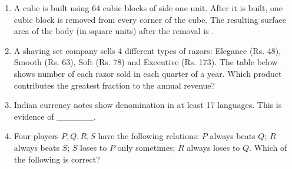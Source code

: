 \documentclass[journal]{IEEEtran}
\begin{document}
\begin{enumerate}
\item A cube is built using 64 cubic blocks of side one unit. After it is built, one cubic block is removed from every corner of the cube. The resulting surface area of the body (in square units) after the removal is . \hfill {}
\begin{enumerate}
\end{enumerate}

\item A shaving set company sells 4 different types of razors: Elegance (Rs. 48), Smooth (Rs. 63), Soft (Rs. 78) and Executive (Rs. 173). The table below shows number of each razor sold in each quarter of a year. Which product contributes the greatest fraction to the annual revenue? \hfill {}
\begin{enumerate}
\end{enumerate}

\item Indian currency notes show denomination in at least 17 languages. This is evidence of \_\_\_\_\_\_. \hfill {}
\begin{enumerate}
\end{enumerate}

\item Four players $P, Q, R, S$ have the following relations: $P$ always beats $Q$; $R$ always beats $S$; $S$ loses to $P$ only sometimes; $R$ always loses to $Q$. Which of the following is correct? \hfill {}
\begin{enumerate}
\end{enumerate}


\end{enumerate}
\end{document}
